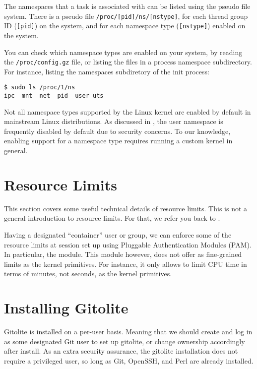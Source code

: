 The namespaces that a task is associated with can be listed using the
\cite{man-5-proc} pseudo file system. There is a pseudo file
\texttt{/proc/[pid]/ns/[nstype]}, for each thread group ID (\texttt{[pid]}) on
the system, and for each namespace type (\texttt{[nstype]}) enabled on the
system.

You can check which namespace types are enabled on your system, by reading the
\texttt{/proc/config.gz} file, or listing the files in a process namespace
subdirectory. For instance, listing the namespaces subdiretory of the init
process:

\begin{lstlisting}
$ sudo ls /proc/1/ns
ipc  mnt  net  pid  user uts
\end{lstlisting}

Not all namespace types supported by the Linux kernel are enabled by default in
mainstream Linux distributions. As discussed in
, the user namespace is frequently
disabled by default due to security concerns. To our knowledge, enabling
support for a namespace type requires running a custom kernel in general.

\section{Resource Limits}

\label{appendix:resource-limits}

This section covers some useful technical details of resource limits. This is
not a general introduction to resource limits. For that, we refer you back to
.

Having a designated ``container'' user or group, we can enforce some of the
resource limits at session set up using Pluggable Authentication Modules (PAM).
In particular, the \cite{pam-limits} module. This module however, does not
offer as fine-grained limits as the kernel primitives. For instance, it only allows
to limit CPU time in terms of minutes, not seconds, as the kernel primitives.

\section{Installing Gitolite}

Gitolite is installed on a per-user basis. Meaning that we should create and
log in as some designated Git user to set up gitolite, or change ownership
accordingly after install. As an extra security assurance, the gitolite
installation does not require a privileged user, so long as Git, OpenSSH, and
Perl are already installed.

